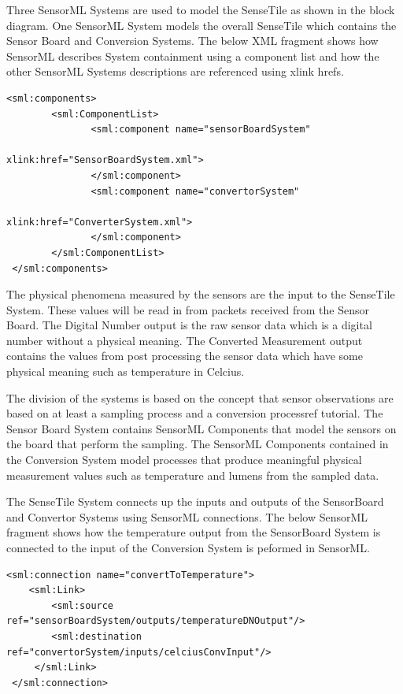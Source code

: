 \documentclass[]{final_report}
\begin{document}
Three SensorML Systems are used to model the SenseTile as shown in the block diagram. One SensorML System models the overall SenseTile which contains the Sensor Board and Conversion Systems. The below XML fragment shows how SensorML describes System containment using a component list and how the other SensorML Systems descriptions are referenced using xlink hrefs.

\lstset{language=XML,basicstyle=\scriptsize,frame=single}
\begin{lstlisting}
<sml:components>
        <sml:ComponentList>
               <sml:component name="sensorBoardSystem" 
                                          xlink:href="SensorBoardSystem.xml">
               </sml:component>
               <sml:component name="convertorSystem"  
                                          xlink:href="ConverterSystem.xml">
               </sml:component>
        </sml:ComponentList>			   
 </sml:components>
\end{lstlisting}

The physical phenomena measured by the sensors are the input to the  SenseTile System. These values will be read in from packets received from the Sensor Board. The Digital Number output is the raw sensor data which is a digital number without a physical meaning. The Converted Measurement output contains the values from post processing the sensor data which have some physical meaning such as temperature in Celcius.

The division of the systems is based on the concept that sensor observations are based on at least a sampling process and a conversion process{ref tutorial}. The Sensor Board System contains SensorML Components that model the sensors on the board that perform the sampling. The SensorML Components contained in the Conversion System model processes that produce meaningful physical measurement values such as temperature and lumens from the sampled data.

The SenseTile System connects up the inputs and outputs of the SensorBoard and Convertor Systems using SensorML connections. The below SensorML fragment shows how the temperature output from the SensorBoard System is connected to the input of the Conversion System is peformed in SensorML.
\newpage
\begin{lstlisting}
<sml:connection name="convertToTemperature">
    <sml:Link>
        <sml:source ref="sensorBoardSystem/outputs/temperatureDNOutput"/>
        <sml:destination ref="convertorSystem/inputs/celciusConvInput"/>
     </sml:Link>
 </sml:connection>
\end{lstlisting}
\end{document}
